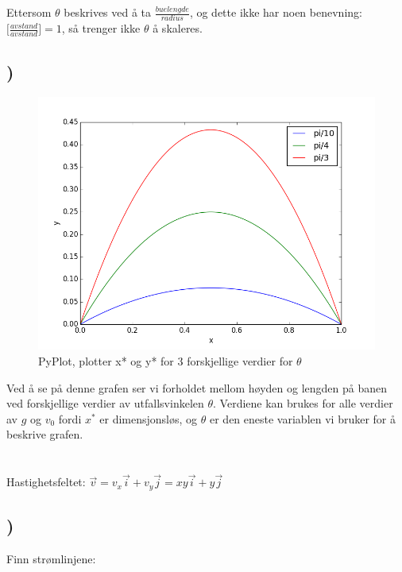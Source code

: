 \documentclass[a4paper,10pt,norsk]{article}
\begin{document}
Ettersom $\theta$ beskrives ved å ta $\frac{buelengde}{radius}$, og dette ikke har noen benevning: $\Big[\frac{avstand}{avstand}\Big] = 1$, så trenger ikke $\theta$ å skaleres.

\subsection{)}



\begin{figure}[h!]
        \centering 
        \includegraphics[scale=0.5]{oppg1.png} 
        \caption{PyPlot, plotter x* og y* for 3 forskjellige verdier for $\theta$}
\end{figure}

Ved å se på denne grafen ser vi forholdet mellom høyden og lengden på banen ved forskjellige verdier av utfallsvinkelen $\theta$. 
Verdiene kan brukes for alle verdier av $g$ og $v_{0}$ fordi $x^{*}$ er dimensjonsløs, og $\theta$ er den eneste variablen vi bruker for å beskrive grafen.

\section{}

Hastighetsfeltet: $\vec{v} = v_{x}\vec{i} + v_{y}\vec{j} = xy\vec{i} + y\vec{j}$

\subsection{)}
Finn strømlinjene:
\end{document}
